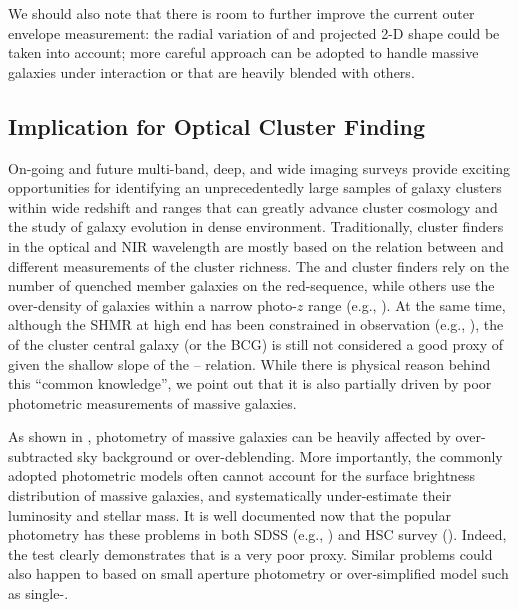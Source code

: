 \documentclass[fleqn,usenatbib,useAMS,english]{mnras}
\begin{document}
    We should also note that there is room to further improve the current outer envelope 
    \mstar{} measurement: the radial variation of \mlratio{} and projected 2-D shape could be 
    taken into account; more careful approach can be adopted to handle massive galaxies under 
    interaction or that are heavily blended with others.
    
\subsection{Implication for Optical Cluster Finding}
    \label{sec:perfect_finder}
    
    On-going and future multi-band, deep, and wide imaging surveys provide exciting opportunities
    for identifying an unprecedentedly large samples of galaxy clusters within wide redshift and
    \mhalo{} ranges that can greatly advance cluster cosmology and the study of galaxy evolution
    in dense environment.
    Traditionally, cluster finders in the optical and NIR wavelength are mostly based on the 
    relation between \mvir{} and different measurements of the cluster richness.
    The \redm{} and \camira{} cluster finders rely on the number of quenched member galaxies
    on the red-sequence, while others use the over-density of galaxies within a narrow 
    photo-$z$ range (e.g., \citealt{Wen2021, Zou2021}).
    At the same time, although the SHMR at high \mstar{} end has been constrained in observation
    (e.g., \citealt{Leauthaud2012, Tinker2017, Kravtsov2018}), the \mstar{} of the cluster
    central galaxy (or the BCG) is still not considered a good proxy of \mvir{} given the shallow
    slope of the \mvir{}--\mstar{} relation.
    While there is physical reason behind this ``common knowledge'', we point out that it is also
    partially driven by poor photometric measurements of massive galaxies.
    
    As shown in \citet{Huang2018b}, photometry of massive galaxies can be heavily affected
    by over-subtracted sky background or over-deblending. 
    More importantly, the commonly adopted photometric models often cannot account for the
    surface brightness distribution of massive galaxies, and systematically under-estimate their
    luminosity and stellar mass.
    It is well documented now that the popular \cmodel{} photometry has these problems in both
    SDSS (e.g., \citealt{Bernardi2013}) and HSC survey (\citealt{Huang2018b}).
    Indeed, the \topn{} test clearly demonstrates that \mcmodel{} is a very poor \mvir{} proxy.
    Similar problems could also happen to \mstar{} based on small aperture photometry or 
    over-simplified model such as single-\ser{}.
    
\end{document}
